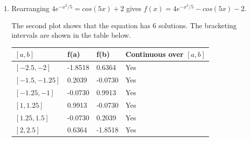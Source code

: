 \documentclass[a4paper,11pt]{article}
\begin{document}
\begin{enumerate}
\begin{enumerate}
	
		\item Rearranging $4e^{-x^{2}/5} = cos(5x) + 2$ gives $f(x) = 
		4e^{-x^{2}/5} - cos(5x) - 2$.
		
		The second plot shows that the equation has 6 solutions. The 
		bracketing intervals are shown in the table below.
		\begin{center}
			\begin{tabular}{l|lll}
				$[a,b]$        & f(a)    & f(b)    & Continuous over $[a,b]$ 
				\\ \hline
				$[-2.5,-2]$    & -1.8518 & 0.6364  & Yes                     
				\\
				$[-1.5,-1.25]$ & 0.2039  & -0.0730 & Yes                     
				\\
				$[-1.25,-1]$   & -0.0730 & 0.9913  & Yes                     
				\\
				$[1,1.25]$     & 0.9913  & -0.0730 & Yes                     
				\\
				$[1.25,1.5]$   & -0.0730 & 0.2039  & Yes                     
				\\
				$[2,2.5]$      & 0.6364  & -1.8518 & Yes                    
			\end{tabular}
		\end{center}
	\end{enumerate}




\end{enumerate}
\end{document}
